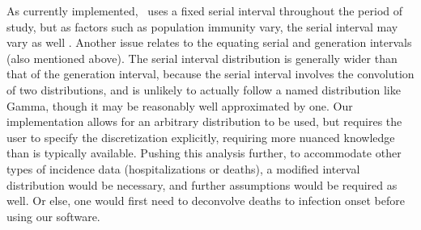 As currently implemented, \RtEstim\ uses a fixed serial interval throughout the
period of study, but as factors such as population immunity vary, the serial
interval may vary as well \citep{nash2023estimating}.  
Another issue relates to the equating serial and generation intervals (also
mentioned above). The serial interval distribution is generally
wider than that of the generation interval, because the serial interval
involves the convolution of two distributions, and is unlikely to actually
follow a named distribution like Gamma, though it may be reasonably well
approximated by one. Our implementation allows for an arbitrary distribution to
be used, but requires the user to specify the discretization explicitly,
requiring more nuanced knowledge than is typically available.
Pushing this analysis further, to accommodate other types of incidence data
(hospitalizations or deaths), a modified interval distribution would be
necessary, and further assumptions would be required as well. Or else, one would
first need to deconvolve deaths to infection onset before using our software.



